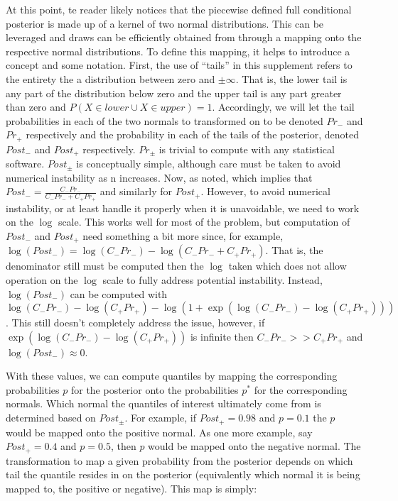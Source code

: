 At this point, te reader likely notices that the piecewise defined full conditional posterior is made up of a kernel of two normal distributions. This can be leveraged and draws can be efficiently obtained from through a mapping onto the respective normal distributions. To define this mapping, it helps to introduce a concept and some notation. First, the use of ``tails'' in this supplement refers to the entirety the a distribution between zero and $\pm \infty$. That is, the lower tail is any part of the distribution below zero and the upper tail is any part greater than zero and $P(X \in lower \cup X \in upper) = 1$. Accordingly, we will let the tail probabilities in each of the two normals to transformed on to be denoted $Pr_{-}$ and $Pr_{+}$ respectively and the probability in each of the tails of the posterior, denoted $Post_{-}$ and $Post_{+}$ respectively. $Pr_{\pm}$ is trivial to compute with any statistical software. $Post_{\pm}$ is conceptually simple, although care must be taken to avoid numerical instability as n increases. Now, as noted,
 which implies that $Post_- = \frac{C_{-} Pr_{-}}{C_{-} Pr_{-} + C_{+} Pr_{+}}$ and similarly for $Post_+$. However, to avoid numerical instability, or at least handle it properly when it is unavoidable, we need to work on the $\log$ scale. This works well for most of the problem, but computation of $Post_-$ and $Post_+$ need something a bit more since, for example, $\log(Post_-) = \log(C_{-}Pr_{-}) - \log(C_{-} Pr_{-} + C_{+} Pr_{+})$. That is, the denominator still must be computed then the $\log$ taken which does not allow operation on the $\log$ scale to fully address potential instability. Instead, $\log(Post_-)$ can be computed with $\log(C_-Pr_-) -  \log(C_+Pr_+) - \log(1 + \exp(\log(C_-Pr_-) -  \log(C_+Pr_+)))$. This still doesn't completely address the issue, however, if $\exp(\log(C_-Pr_-) -  \log(C_+Pr_+))$ is infinite then $C_-Pr_- >> C_+Pr_+$ and $\log(Post_-) \approx 0$.

With these values, we can compute quantiles by mapping the corresponding probabilities $p$ for the posterior onto the probabilities $p^*$ for the corresponding normals. Which normal the quantiles of interest ultimately come from is determined based on $Post_{\pm}$. For example, if $Post_{+} = 0.98$ and $p = 0.1$ the $p$ would be mapped onto the positive normal. As one more example, say $Post_{+} = 0.4$ and $p = 0.5$, then $p$ would be mapped onto the negative normal. The transformation to map a given probability from the posterior depends on which tail the quantile resides in on the posterior (equivalently which normal it is being mapped to, the positive or negative). This map is simply:

